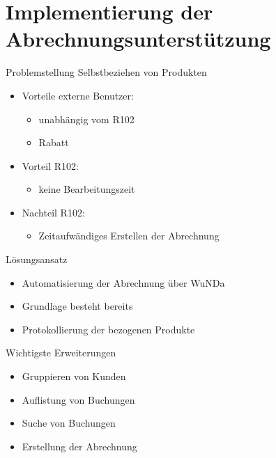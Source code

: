 \documentclass{beamer}
\begin{document}
\section{Implementierung der Abrechnungsunterstützung}


\begin{frame}{Problemstellung}
  Selbstbeziehen von Produkten \pause	  
  \begin{itemize}
  \item Vorteile externe Benutzer: 
  \begin{itemize}
  	\item unabhängig vom R102 \pause
  	\item Rabatt \pause
  \end{itemize}
  \item<4-> Vorteil R102:
  \begin{itemize}
  \item keine Bearbeitungszeit
  \end{itemize}
  \item<5-> Nachteil R102:
  \begin{itemize}
  \item Zeitaufwändiges Erstellen der Abrechnung
  \end{itemize}
  \end{itemize}
\end{frame}

\begin{frame}{Lösungsansatz}
  \begin{itemize}
  \item
    Automatisierung der Abrechnung über WuNDa
    \pause
  \item
    Grundlage besteht bereits \pause
  \item Protokollierung der bezogenen Produkte  
  \end{itemize}
\end{frame}

\begin{frame}{Wichtigste Erweiterungen}
  \begin{itemize}
  \item
    Gruppieren von Kunden
    \pause
  \item
    Auflistung von Buchungen \pause
  \item Suche von Buchungen \pause
  \item Erstellung der Abrechnung
  \end{itemize}
\end{frame}
\end{document}

